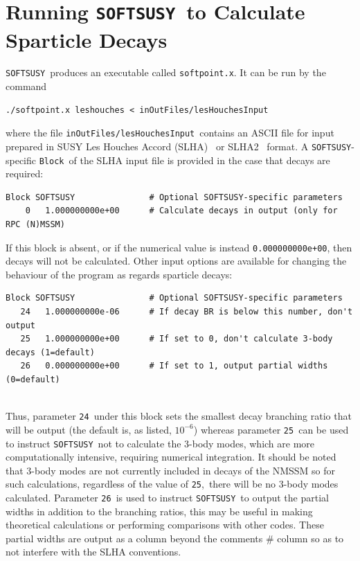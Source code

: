 \documentclass[final,3p,times]{elsarticle}
\def\SOFTSUSY{{\tt SOFTSUSY}}
\def\code#1{{\tt #1}}
\begin{document}
\appendix

\section{Running \SOFTSUSY~to Calculate Sparticle Decays} \label{sec:run}

\SOFTSUSY~produces an executable called \code{softpoint.x}. It can be run by
the command
\begin{verbatim}
./softpoint.x leshouches < inOutFiles/lesHouchesInput
\end{verbatim}
where the file \code{inOutFiles/lesHouchesInput}~contains an ASCII file
for input
prepared in SUSY Les Houches Accord (SLHA)~\cite{Skands:2003cj} or
SLHA2~\cite{Allanach:2008qq} format. 
A \code{SOFTSUSY}-specific \code{Block}~of the SLHA input file is provided in
the case that decays are required:
\begin{verbatim}
Block SOFTSUSY               # Optional SOFTSUSY-specific parameters
    0   1.000000000e+00      # Calculate decays in output (only for RPC (N)MSSM)
\end{verbatim}
If this block is absent, or if the numerical value is instead
\code{0.000000000e+00}, then decays will not be calculated. 
Other input options are available for changing the behaviour of the program as
regards sparticle decays:
\begin{verbatim}
Block SOFTSUSY               # Optional SOFTSUSY-specific parameters
   24   1.000000000e-06      # If decay BR is below this number, don't output
   25   1.000000000e+00      # If set to 0, don't calculate 3-body decays (1=default)
   26   0.000000000e+00      # If set to 1, output partial widths (0=default)
   
\end{verbatim}
Thus, parameter \code{24}~under this block sets the smallest decay branching
ratio that will be output (the default is, as listed, $10^{-6}$) whereas 
parameter \code{25}~can be used to instruct \code{SOFTSUSY}~not to calculate
the 3-body modes, which are more computationally intensive, requiring
numerical integration. It should be noted that 3-body modes are not currently
included 
in decays of the NMSSM so for such calculations, regardless of the value
of \code{25},~there will be no 3-body modes calculated. Parameter \code{26}~is used to
instruct 
\code{SOFTSUSY}~to output the partial widths in addition to the branching
ratios, this 
may be useful in making theoretical calculations or performing comparisons
with other 
codes. These partial widths are output as a column beyond the comments $\#$
column so 
as to not interfere with the SLHA conventions. 
\end{document}
